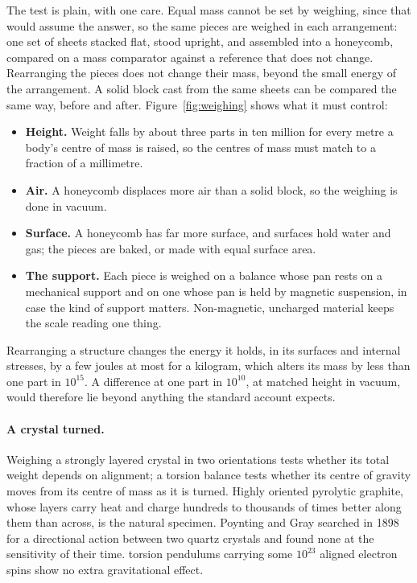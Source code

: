\documentclass[11pt,a4paper]{article}
\begin{document}
 The test is plain, with one care. Equal mass cannot be set by weighing, since that would assume the answer, so the same pieces are weighed in each arrangement: one set of sheets stacked flat, stood upright, and assembled into a honeycomb, compared on a mass comparator against a reference that does not change. Rearranging the pieces does not change their mass, beyond the small energy of the arrangement. A solid block cast from the same sheets can be compared the same way, before and after. Figure~\ref{fig:weighing} shows what it must control:
\begin{itemize}
\item \textbf{Height.} Weight falls by about three parts in ten million for every metre a body's centre of mass is raised, so the centres of mass must match to a fraction of a millimetre.
\item \textbf{Air.} A honeycomb displaces more air than a solid block, so the weighing is done in vacuum.
\item \textbf{Surface.} A honeycomb has far more surface, and surfaces hold water and gas; the pieces are baked, or made with equal surface area.
\item \textbf{The support.} Each piece is weighed on a balance whose pan rests on a mechanical support and on one whose pan is held by magnetic suspension, in case the kind of support matters. Non-magnetic, uncharged material keeps the scale reading one thing.
\end{itemize}
 Rearranging a structure changes the energy it holds, in its surfaces and internal stresses, by a few joules at most for a kilogram, which alters its mass by less than one part in $10^{15}$. A difference at one part in $10^{10}$, at matched height in vacuum, would therefore lie beyond anything the standard account expects.

\paragraph{A crystal turned.} Weighing a strongly layered crystal in two orientations tests whether its total weight depends on alignment; a torsion balance tests whether its centre of gravity moves from its centre of mass as it is turned. Highly oriented pyrolytic graphite, whose layers carry heat and charge hundreds to thousands of times better along them than across, is the natural specimen. Poynting and Gray searched in 1898 for a directional action between two quartz crystals and found none at the sensitivity of their time.  torsion pendulums carrying some $10^{23}$ aligned electron spins show no extra gravitational effect.
\end{document}

